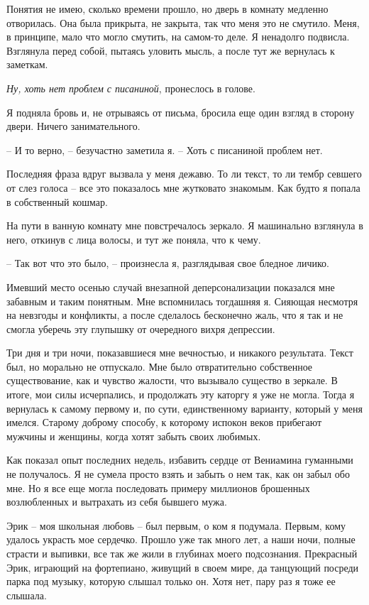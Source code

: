 \documentclass[
]{book}
\begin{document}
Понятия не имею, сколько времени прошло, но дверь в комнату медленно отворилась. Она была прикрыта, не закрыта, так что меня это не смутило. Меня, в принципе, мало что могло смутить, на самом-то деле. Я ненадолго подвисла. Взглянула перед собой, пытаясь уловить мысль, а после тут же вернулась к заметкам.

\emph{Ну, хоть нет проблем с писаниной}, пронеслось в голове.

Я подняла бровь и, не отрываясь от письма, бросила еще один взгляд в сторону двери. Ничего занимательного.

-- И то верно, -- безучастно заметила я. -- Хоть с писаниной проблем нет.

Последняя фраза вдруг вызвала у меня дежавю. То ли текст, то ли тембр севшего от слез голоса -- все это показалось мне жутковато знакомым. Как будто я попала в собственный кошмар.

На пути в ванную комнату мне повстречалось зеркало. Я машинально взглянула в него, откинув с лица волосы, и тут же поняла, что к чему.

-- Так вот что это было, -- произнесла я, разглядывая свое бледное личико.

Имевший место осенью случай внезапной деперсонализации показался мне забавным и таким понятным. Мне вспомнилась тогдашняя я. Сияющая несмотря на невзгоды и конфликты, а после сделалось бесконечно жаль, что я так и не смогла уберечь эту глупышку от очередного вихря депрессии.

Три дня и три ночи, показавшиеся мне вечностью, и никакого результата. Текст был, но морально не отпускало. Мне было отвратительно собственное существование, как и чувство жалости, что вызывало существо в зеркале. В итоге, мои силы исчерпались, и продолжать эту каторгу я уже не могла. Тогда я вернулась к самому первому и, по сути, единственному варианту, который у меня имелся. Старому доброму способу, к которому испокон веков прибегают мужчины и женщины, когда хотят забыть своих любимых.

Как показал опыт последних недель, избавить сердце от Вениамина гуманными не получалось. Я не сумела просто взять и забыть о нем так, как он забыл обо мне. Но я все еще могла последовать примеру миллионов брошенных возлюбленных и вытрахать из себя бывшего мужа.

Эрик -- моя школьная любовь -- был первым, о ком я подумала. Первым, кому удалось украсть мое сердечко. Прошло уже так много лет, а наши ночи, полные страсти и выпивки, все так же жили в глубинах моего подсознания. Прекрасный Эрик, играющий на фортепиано, живущий в своем мире, да танцующий посреди парка под музыку, которую слышал только он. Хотя нет, пару раз я тоже ее слышала.
\end{document}
